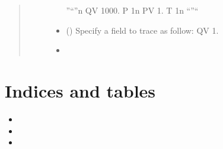 \documentclass[a4paper,10pt,english]{sphinxmanual}
\begin{document}
\begin{fulllineitems}
\begin{fulllineitems}
\begin{quote}
\begin{description}
\begin{itemize}
”“”n
QV      1000. P 1n
PV      1.    T 1n
“”“


\item {} 
 (\sphinxstyleliteralemphasis{,}) \textendash{} Specify a field to trace as follow: QV 1.

\item {} 
 \textendash{} 

\end{itemize}

\end{description}\end{quote}

\end{fulllineitems}


\end{fulllineitems}



\chapter{Indices and tables}
\label{\detokenize{index:indices-and-tables}}\begin{itemize}
\item {} 

\item {} 

\item {} 

\end{itemize}



\renewcommand{\indexname}{Index}
\printindex
\end{document}

